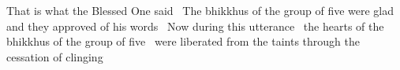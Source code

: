 \ifafive\clearpage\fi
\begin{english-only-hang}
  That is what the Blessed One said \breathmark\ The bhikkhus of the group of five were glad and they approved of his words \breathmark\ Now during this utterance \breathmark\ the hearts of the bhikkhus of the group of five \breathmark\ were liberated from the taints through the cessation of clinging
\end{english-only-hang}

\suttaRef{[SN 22.59]}

\ifdigital{}\fi

